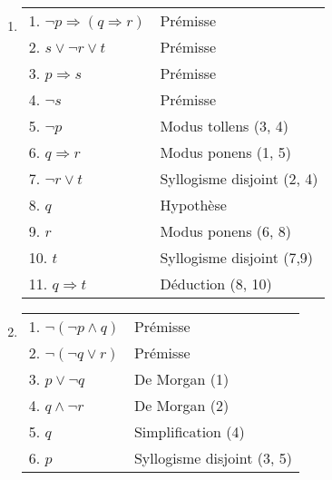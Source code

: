 \begin{enumerate}
	\item  \hspace{1em}
    \begin{center}
    \begin{tabular}{|l|l|}
    \hline
    1. $\lnot p \Rightarrow (q \Rightarrow r)$ & Prémisse \\
    2. $s \lor \lnot r \lor t$ & Prémisse \\
    3. $p \Rightarrow s$ & Prémisse \\
    4. $\lnot s$ & Prémisse \\
    5. $\lnot p$ & Modus tollens (3, 4) \\ 
    6. $q \Rightarrow r$ & Modus ponens (1, 5) \\
    7. $\lnot r \lor t$ & Syllogisme disjoint (2, 4) \\
    \hspace{0.5cm} 8. $q$ & Hypothèse \\
    \hspace{0.5cm} 9. $r$ & Modus ponens (6, 8) \\
    \hspace{0.5cm} 10. $t$ & Syllogisme disjoint (7,9) \\
    11. $q \Rightarrow t$ & Déduction (8, 10) \\
    \hline
    \end{tabular}
    \end{center}
    
	\item  \hspace{1em}
    \begin{center}
    \begin{tabular}{|l|l|}
    \hline
    1. $\lnot ( \lnot p \land q)$ & Prémisse \\
    2. $\lnot ( \lnot q \lor r)$ & Prémisse \\
    3. $p \lor \lnot q$ & De Morgan (1) \\
    4. $q \land \lnot r$ & De Morgan (2) \\
    5. $q$ & Simplification (4) \\
    6. $p$ & Syllogisme disjoint (3, 5) \\
    \hline
    \end{tabular}
    \end{center}
    

\end{enumerate}
